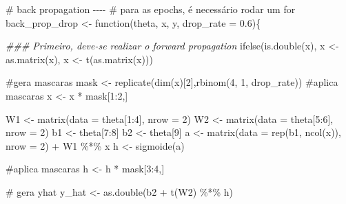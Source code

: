\documentclass[
  a4paperpaper,
]{article}
\newenvironment{Shaded}{\begin{snugshade}}{\end{snugshade}}
\newcommand{\AttributeTok}[1]{\textcolor[rgb]{0.40,0.45,0.13}{#1}}
\newcommand{\CommentTok}[1]{\textcolor[rgb]{0.37,0.37,0.37}{#1}}
\newcommand{\ControlFlowTok}[1]{\textcolor[rgb]{0.00,0.23,0.31}{#1}}
\newcommand{\DecValTok}[1]{\textcolor[rgb]{0.68,0.00,0.00}{#1}}
\newcommand{\DocumentationTok}[1]{\textcolor[rgb]{0.37,0.37,0.37}{\textit{#1}}}
\newcommand{\FloatTok}[1]{\textcolor[rgb]{0.68,0.00,0.00}{#1}}
\newcommand{\FunctionTok}[1]{\textcolor[rgb]{0.28,0.35,0.67}{#1}}
\newcommand{\NormalTok}[1]{\textcolor[rgb]{0.00,0.23,0.31}{#1}}
\newcommand{\OtherTok}[1]{\textcolor[rgb]{0.00,0.23,0.31}{#1}}
\newcommand{\SpecialCharTok}[1]{\textcolor[rgb]{0.37,0.37,0.37}{#1}}
\begin{document}
\begin{Shaded}
\begin{Highlighting}[]
\CommentTok{\# back propagation {-}{-}{-}{-}}
\CommentTok{\# para as epochs, é necessário rodar um for}
\NormalTok{back\_prop\_drop }\OtherTok{\textless{}{-}} \ControlFlowTok{function}\NormalTok{(theta, x, y, }\AttributeTok{drop\_rate =} \FloatTok{0.6}\NormalTok{)\{}

  \DocumentationTok{\#\#\# Primeiro, deve{-}se realizar o forward propagation}
  \FunctionTok{ifelse}\NormalTok{(}\FunctionTok{is.double}\NormalTok{(x), x }\OtherTok{\textless{}{-}} \FunctionTok{as.matrix}\NormalTok{(x), x }\OtherTok{\textless{}{-}} \FunctionTok{t}\NormalTok{(}\FunctionTok{as.matrix}\NormalTok{(x)))}
  
    \CommentTok{\#gera mascaras}
\NormalTok{    mask }\OtherTok{\textless{}{-}} \FunctionTok{replicate}\NormalTok{(}\FunctionTok{dim}\NormalTok{(x)[}\DecValTok{2}\NormalTok{],}\FunctionTok{rbinom}\NormalTok{(}\DecValTok{4}\NormalTok{, }\DecValTok{1}\NormalTok{, drop\_rate))}
    \CommentTok{\#aplica mascaras}
\NormalTok{    x }\OtherTok{\textless{}{-}}\NormalTok{ x }\SpecialCharTok{*}\NormalTok{ mask[}\DecValTok{1}\SpecialCharTok{:}\DecValTok{2}\NormalTok{,]}
  
\NormalTok{  W1 }\OtherTok{\textless{}{-}} \FunctionTok{matrix}\NormalTok{(}\AttributeTok{data =}\NormalTok{ theta[}\DecValTok{1}\SpecialCharTok{:}\DecValTok{4}\NormalTok{], }\AttributeTok{nrow =} \DecValTok{2}\NormalTok{)}
\NormalTok{  W2 }\OtherTok{\textless{}{-}} \FunctionTok{matrix}\NormalTok{(}\AttributeTok{data =}\NormalTok{ theta[}\DecValTok{5}\SpecialCharTok{:}\DecValTok{6}\NormalTok{], }\AttributeTok{nrow =} \DecValTok{2}\NormalTok{)}
\NormalTok{  b1 }\OtherTok{\textless{}{-}}\NormalTok{ theta[}\DecValTok{7}\SpecialCharTok{:}\DecValTok{8}\NormalTok{]}
\NormalTok{  b2 }\OtherTok{\textless{}{-}}\NormalTok{ theta[}\DecValTok{9}\NormalTok{]}
\NormalTok{  a }\OtherTok{\textless{}{-}} \FunctionTok{matrix}\NormalTok{(}\AttributeTok{data =} \FunctionTok{rep}\NormalTok{(b1, }\FunctionTok{ncol}\NormalTok{(x)), }\AttributeTok{nrow =} \DecValTok{2}\NormalTok{) }\SpecialCharTok{+}\NormalTok{ W1 }\SpecialCharTok{\%*\%}\NormalTok{ x}
\NormalTok{  h }\OtherTok{\textless{}{-}} \FunctionTok{sigmoide}\NormalTok{(a)}
    
  \CommentTok{\#aplica mascaras}
\NormalTok{  h }\OtherTok{\textless{}{-}}\NormalTok{ h }\SpecialCharTok{*}\NormalTok{ mask[}\DecValTok{3}\SpecialCharTok{:}\DecValTok{4}\NormalTok{,]}
  
  \CommentTok{\# gera yhat}
\NormalTok{  y\_hat }\OtherTok{\textless{}{-}} \FunctionTok{as.double}\NormalTok{(b2 }\SpecialCharTok{+} \FunctionTok{t}\NormalTok{(W2) }\SpecialCharTok{\%*\%}\NormalTok{ h)}
  

\end{Highlighting}
\end{Shaded}
\end{document}
